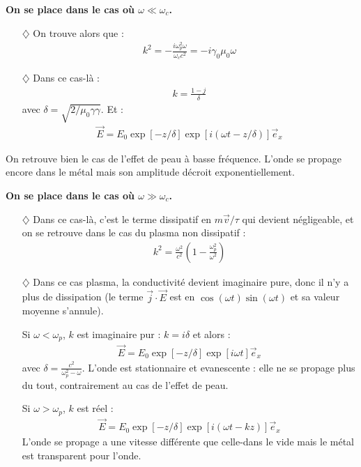 \documentclass{report}
\begin{document}
\textbf{On se place dans le cas où $\omega\ll\omega_c$.}

\begin{itemize}

	\item[$\diamondsuit$] On trouve alors que :
	\begin{align*}
		k^2=-\frac{i\omega_p^2\omega}{\omega_cc^2}=-i\gamma_0\mu_0\omega
	\end{align*}

	\item[$\diamondsuit$] Dans ce cas-là :
	\begin{align*}
		k = \frac{1-j}{\delta}
	\end{align*}
	avec $\delta=\sqrt{2/\mu_0\gamma\gamma}$.
	Et :
	\begin{align}
     	\vec{E}=E_{0}\exp[-z/\delta]\exp[i(\omega t-z/\delta)]\vec{e}_x
	\end{align}
\end{itemize}
On retrouve bien le cas de l'effet de peau à basse fréquence. L'onde se propage encore dans le métal mais son amplitude décroit exponentiellement.

\textbf{On se place dans le cas où $\omega\gg\omega_c$.}

\begin{itemize}

	\item[$\diamondsuit$] Dans ce cas-là, c'est le terme dissipatif en $m\vec{v}/\tau$ qui devient négligeable, et on se retrouve dans le cas du plasma non dissipatif :
	\begin{align*}
		k^2=\frac{\omega^2}{c^2}\left( 1-\frac{\omega_p^2}{\omega^2}\right) 
	\end{align*}
	
	\item[$\diamondsuit$] Dans ce cas plasma, la conductivité devient imaginaire pure, donc il n'y a plus de dissipation (le terme $\vec{j}\cdot\vec{E}$ est en $\cos(\omega t)\sin(\omega t)$ et sa valeur moyenne s'annule).
	
	Si $\omega<\omega_p$, $k$ est imaginaire pur : $k=i\delta$ et alors :
	\begin{align}
     	\vec{E}=E_{0}\exp[-z/\delta]\exp[i\omega t]\vec{e}_x
	\end{align}
	avec $\delta = \frac{c^2}{\omega_p^2-\omega}$. L'onde est stationnaire et evanescente : elle ne se propage plus du tout, contrairement au cas de l'effet de peau. 
	
	Si $\omega>\omega_p$, $k$ est réel : 
	\begin{align}
     	\vec{E}=E_{0}\exp[-z/\delta]\exp[i(\omega t-kz)]\vec{e}_x
	\end{align}
L'onde se propage a une vitesse différente que celle-dans le vide mais le métal est transparent pour l'onde.

\end{itemize}
\end{document}
